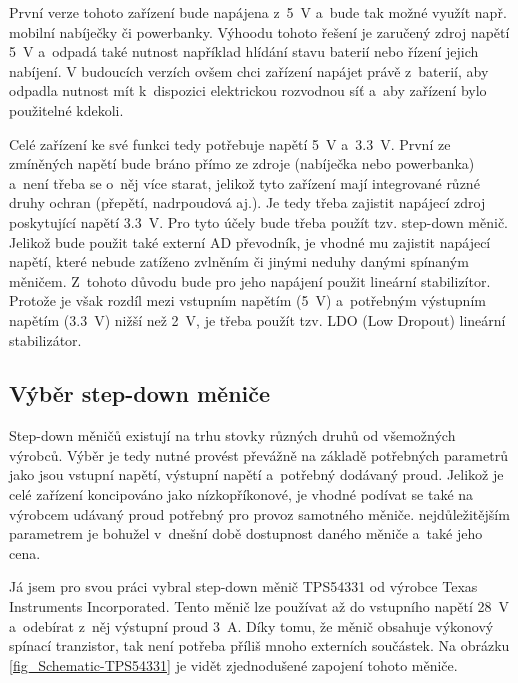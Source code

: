 První verze tohoto zařízení bude napájena z~\SI{5}{\volt} a~bude tak možné využít např. mobilní nabíječky či powerbanky. Výhoodu tohoto řešení je zaručený zdroj napětí \SI{5}{\volt} a~odpadá také nutnost například hlídání stavu baterií nebo řízení jejich nabíjení. V budoucích verzích ovšem chci zařízení napájet právě z~baterií, aby odpadla nutnost mít k~dispozici elektrickou rozvodnou síť a~aby zařízení bylo použitelné kdekoli.

Celé zařízení ke své funkci tedy potřebuje napětí \SI{5}{\volt} a~\SI{3,3}{\volt}. První ze zmíněných napětí bude bráno přímo ze zdroje (nabíječka nebo powerbanka) a~není třeba se o~něj více starat, jelikož tyto zařízení mají integrované různé druhy ochran (přepětí, nadrpoudová aj.). Je tedy třeba zajistit napájecí zdroj poskytující napětí \SI{3,3}{\volt}. Pro tyto účely bude třeba použít tzv. step-down měnič. Jelikož bude použit také externí AD převodník, je vhodné mu zajistit napájecí napětí, které nebude zatíženo zvlněním či jinými neduhy danými spínaným měničem. Z~tohoto důvodu bude pro jeho napájení použit lineární stabilizítor. Protože je však rozdíl mezi vstupním napětím (\SI{5}{\volt}) a~potřebným výstupním napětím (\SI{3,3}{\volt}) nižší než \SI{2}{\volt}, je třeba použít tzv. LDO (Low Dropout) lineární stabilizátor.

\subsection{Výběr step-down měniče}

Step-down měničů existují na trhu stovky různých druhů od všemožných výrobců. Výběr je tedy nutné provést převážně na základě potřebných parametrů jako jsou vstupní napětí, výstupní napětí a~potřebný dodávaný proud. Jelikož je celé zařízení koncipováno jako nízkopříkonové, je vhodné podívat se také na výrobcem udávaný proud potřebný pro provoz samotného měniče. nejdůležitějším parametrem je bohužel v~dnešní době dostupnost daného měniče a~také jeho cena.

Já jsem pro svou práci vybral step-down měnič TPS54331 od výrobce Texas Instruments Incorporated\cite{dat_TPS54331}. Tento měnič lze používat až do vstupního napětí \SI{28}{\volt} a~odebírat z~něj výstupní proud \SI{3}{\ampere}. Díky tomu, že měnič obsahuje výkonový spínací tranzistor, tak není potřeba příliš mnoho externích součástek. Na obrázku \ref{fig_Schematic-TPS54331} je vidět zjednodušené zapojení tohoto měniče.

